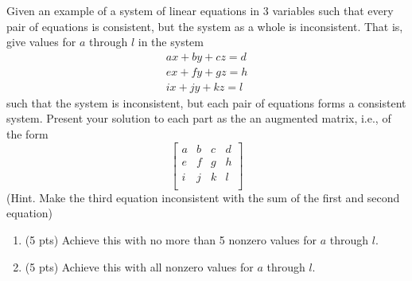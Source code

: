 \documentclass{article}
\theoremstyle{remark}
\begin{document}
Given an example of a system of linear equations in 3 variables such that every pair of equations is consistent, but the system as a whole is inconsistent. That is, give values for $a$ through $l$ in the system
\begin{align*}
  ax + by + cz = d \\
  ex + fy + gz = h \\
  ix + jy + kz = l
\end{align*}
such that the system is inconsistent, but each pair of equations forms a consistent system. Present your solution to each part as the an augmented matrix, i.e., of the form
\begin{displaymath}
  \begin{bmatrix}
    a & b & c & d \\
    e & f & g & h \\
    i & j & k & l \\
  \end{bmatrix}
\end{displaymath}
(Hint. Make the third equation inconsistent with the sum of the first and second equation)
\begin{enumerate}
\item (5 pts) Achieve this with no more than 5 nonzero values for $a$ through $l$.
\item (5 pts) Achieve this with all nonzero values for $a$ through $l$.
\end{enumerate}
\end{document}
